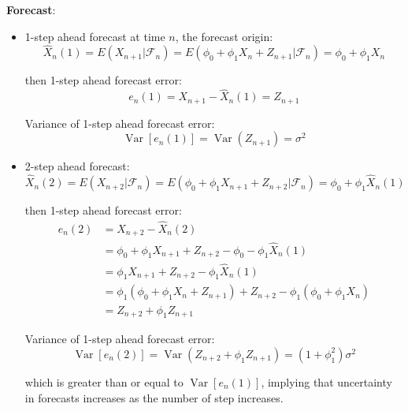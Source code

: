 \documentclass{article}
\begin{document}
\noindent \textbf{Forecast}: \\
\begin{itemize}
	\item 1-step ahead forecast at time $n$, the forecast origin:
	\begin{equation*}
	\hat{X}_{n}(1) = E\left(X_{n+1}| \mathscr{F}_n\right) = E\left(\phi_{0}+\phi_{1} X_{n} + Z_{n+1}| \mathscr{F}_n\right) = \phi_{0}+\phi_{1} X_{n}
	\end{equation*}
	
	\noindent then 1-step ahead forecast error:
	\begin{equation*}
	e_{n}(1)=X_{n+1}-\hat{X}_{n}(1)=Z_{n+1}
	\end{equation*}
	
	\noindent Variance of 1-step ahead forecast error:
	\begin{equation*}
	\operatorname{Var}\left[e_{n}(1)\right]=\operatorname{Var}\left(Z_{n+1}\right)=\sigma^{2}
	\end{equation*}
	
	\item 2-step ahead forecast:
	\begin{equation*}
	\hat{X}_{n}(2) = E\left(X_{n+2}| \mathscr{F}_n\right) = E\left(\phi_{0}+\phi_{1} X_{n+1} + Z_{n+2}| \mathscr{F}_n\right) = \phi_{0}+\phi_{1} \hat{X}_{n}(1)
	\end{equation*}
	
	\noindent then 1-step ahead forecast error:
	\begin{equation*}
	\begin{array}{ll} {e_{n}(2)} & = {X_{n+2} - \hat{X}_{n}(2)}\\ & = {\phi_{0} + \phi_{1}X_{n+1} + Z_{n+2} - \phi_{0} - \phi_{1} \hat{X}_{n}(1)}\\ & = {\phi_{1}X_{n+1} + Z_{n+2} - \phi_{1} \hat{X}_{n}(1)}\\ & = {\phi_{1}(\phi_{0}+\phi_{1} X_{n}+Z_{n+1}) + Z_{n+2} - \phi_1(\phi_{0}+\phi_{1} X_{n})}\\ & = {Z_{n+2} + \phi_1 Z_{n+1}}
	\end{array}
	\end{equation*}
	
	\noindent Variance of 1-step ahead forecast error:
	\begin{equation*}
	\operatorname{Var}\left[e_{n}(2)\right]=\operatorname{Var}\left(Z_{n+2} + \phi_1 Z_{n+1}\right)=(1+\phi_1^2)\sigma^{2}
	\end{equation*}
	
	\noindent which is greater than or equal to $\operatorname{Var}\left[e_{n}(1)\right]$, implying that uncertainty in forecasts increases as the number of step increases.
\end{itemize}
\end{document}
